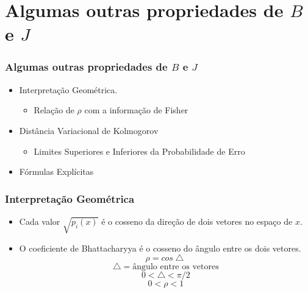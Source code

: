 \documentclass{beamer}
\begin{document}
\begin{comment}
\begin{frame}
    \frametitle{Processos de Poisson com Funções de Valor Médio Desiguais}
    
    
\end{frame}

\end{comment}

\section{Algumas outras propriedades de $B$ e $J$}


\begin{frame}
    \frametitle{Algumas outras propriedades de $B$ e $J$}
    
    \begin{itemize}
    	\setlength\itemsep{1em}
        \item Interpretação Geométrica.
        \begin{itemize}
        	\item Relação de $\rho$ com a informação de Fisher
        \end{itemize}
    	\item Distância Variacional de Kolmogorov
    	\begin{itemize}
			\item Limites Superiores e Inferiores da Probabilidade de Erro    	
    	\end{itemize}
	    \item Fórmulas Explícitas
	\end{itemize}
    
\end{frame}

\begin{frame}
    \frametitle{Interpretação Geométrica}
    
	\begin{itemize}
		\setlength\itemsep{1em}
		\item Cada valor $\sqrt{p_i(x)}$ é o cosseno da direção de dois vetores no espaço de $x$.
		\item O coeficiente de Bhattacharyya é o cosseno do ângulo entre os dois vetores.
		$$ \rho = cos\bigtriangleup$$
		$$ \bigtriangleup = \text{ângulo entre os vetores}$$
		$$ 0 < \bigtriangleup < \pi/2 $$
		$$ 0 < \rho < 1 $$
	\end{itemize}	    
    


\end{frame}
\end{document}
